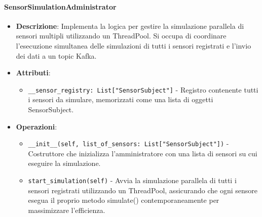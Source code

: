 \documentclass[10pt]{article}
\begin{document}
    \paragraph{SensorSimulationAdministrator}
    \begin{itemize} 
    \item \textbf{Descrizione}: Implementa la logica per gestire la simulazione parallela di sensori multipli utilizzando un ThreadPool. Si occupa di coordinare l'esecuzione simultanea delle simulazioni di tutti i sensori registrati e l'invio dei dati a un topic Kafka.
    \item \textbf{Attributi}:
    \begin{itemize}
        \item \texttt{\_\_sensor\_registry: List["SensorSubject"]} - Registro contenente tutti i sensori da simulare, memorizzati come una lista di oggetti SensorSubject.
    \end{itemize}
    
    \item \textbf{Operazioni}:
    \begin{itemize}
        \item \texttt{\_\_init\_\_(self, list\_of\_sensors: List["SensorSubject"])} - Costruttore che inizializza l'amministratore con una lista di sensori su cui eseguire la simulazione.
        
        \item \texttt{start\_simulation(self)} - Avvia la simulazione parallela di tutti i sensori registrati utilizzando un ThreadPool, assicurando che ogni sensore esegua il proprio metodo simulate() contemporaneamente per massimizzare l'efficienza.
    \end{itemize}
    \end{itemize}
\end{document}
